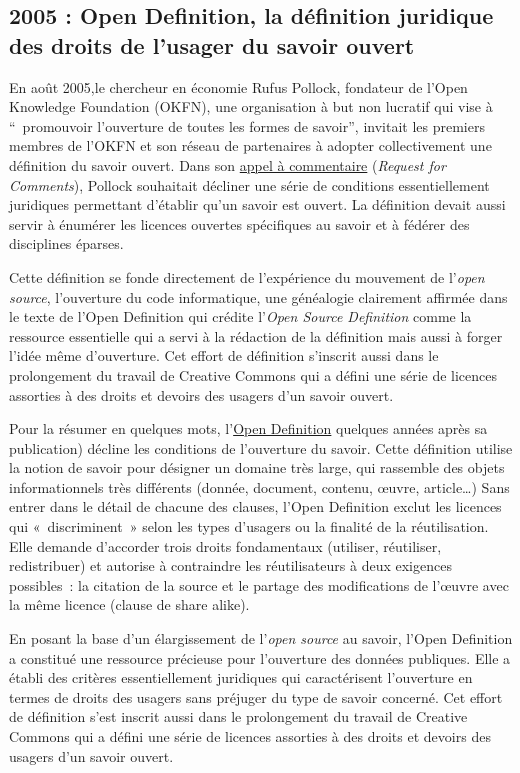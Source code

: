 \documentclass[]{book}
\theoremstyle{definition}
\theoremstyle{definition}
\theoremstyle{definition}
\theoremstyle{remark}
\begin{document}
\subsection{2005 : Open Definition, la définition juridique des droits
de l'usager du savoir
ouvert}\label{open-definition-la-definition-juridique-des-droits-de-lusager-du-savoir-ouvert}

En août 2005,le chercheur en économie Rufus Pollock, fondateur de l'Open
Knowledge Foundation (OKFN), une organisation à but non lucratif qui
vise à ``~promouvoir l'ouverture de toutes les formes de savoir'',
invitait les premiers membres de l'OKFN et son réseau de partenaires à
adopter collectivement une définition du savoir ouvert. Dans son
\href{https://lists.okfn.org/pipermail/okfn-discuss/2005-August/005233.html}{appel
à commentaire} (\emph{Request for Comments}), Pollock souhaitait
décliner une série de conditions essentiellement juridiques permettant
d'établir qu'un savoir est ouvert. La définition devait aussi servir à
énumérer les licences ouvertes spécifiques au savoir et à fédérer des
disciplines éparses.

Cette définition se fonde directement de l'expérience du mouvement de
l'\emph{open source}, l'ouverture du code informatique, une généalogie
clairement affirmée dans le texte de l'Open Definition qui crédite
l'\emph{Open Source Definition} comme la ressource essentielle qui a
servi à la rédaction de la définition mais aussi à forger l'idée même
d'ouverture. Cet effort de définition s'inscrit aussi dans le
prolongement du travail de Creative Commons qui a défini une série de
licences assorties à des droits et devoirs des usagers d'un savoir
ouvert.

Pour la résumer en quelques mots, l'\href{opendefinition.org}{Open
Definition} quelques années après sa publication) décline les conditions
de l'ouverture du savoir. Cette définition utilise la notion de savoir
pour désigner un domaine très large, qui rassemble des objets
informationnels très différents (donnée, document, contenu, œuvre,
article\ldots{}) Sans entrer dans le détail de chacune des clauses,
l'Open Definition exclut les licences qui «~discriminent~» selon les
types d'usagers ou la finalité de la réutilisation. Elle demande
d'accorder trois droits fondamentaux (utiliser, réutiliser,
redistribuer) et autorise à contraindre les réutilisateurs à deux
exigences possibles~: la citation de la source et le partage des
modifications de l'œuvre avec la même licence (clause de share alike).

En posant la base d'un élargissement de l'\emph{open source} au savoir,
l'Open Definition a constitué une ressource précieuse pour l'ouverture
des données publiques. Elle a établi des critères essentiellement
juridiques qui caractérisent l'ouverture en termes de droits des usagers
sans préjuger du type de savoir concerné. Cet effort de définition s'est
inscrit aussi dans le prolongement du travail de Creative Commons qui a
défini une série de licences assorties à des droits et devoirs des
usagers d'un savoir ouvert.
\end{document}
